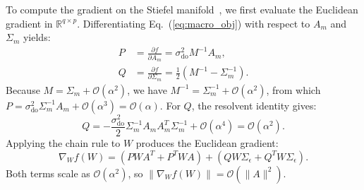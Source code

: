 \documentclass[preprint,12pt]{elsarticle}
\begin{document}
To compute the gradient on the Stiefel manifold~\cite{Edelman1998,Absil2008}, we first evaluate the Euclidean gradient in $\mathbb{R}^{q \times p}$. Differentiating Eq.~(\ref{eq:macro_obj}) with respect to $A_m$ and $\Sigma_m$ yields:
\begin{align}
P &= \frac{\partial f}{\partial A_m} = \sigma_{\mathrm{do}}^2 M^{-1} A_m, \label{eq:P_deriv} \\
Q &= \frac{\partial f}{\partial \Sigma_m} = \frac{1}{2} \left( M^{-1} - \Sigma_m^{-1} \right). \label{eq:Q_deriv}
\end{align}
Because $M = \Sigma_m + \mathcal{O}(\alpha^2)$, we have $M^{-1} = \Sigma_m^{-1} + \mathcal{O}(\alpha^2)$, from which $P = \sigma_{\mathrm{do}}^2 \Sigma_m^{-1} A_m + \mathcal{O}(\alpha^3) = \mathcal{O}(\alpha)$. For $Q$, the resolvent identity gives:
\begin{equation}
Q = -\frac{\sigma_{\mathrm{do}}^2}{2} \Sigma_m^{-1} A_m A_m^T \Sigma_m^{-1} + \mathcal{O}(\alpha^4) = \mathcal{O}(\alpha^2).
\end{equation}
Applying the chain rule to $W$ produces the Euclidean gradient:
\begin{equation}
\nabla_W f(W) = \left( P W A^T + P^T W A \right) + \left( Q W \Sigma_\epsilon + Q^T W \Sigma_\epsilon \right).
\label{eq:euclidean_grad}
\end{equation}
Both terms scale as $\mathcal{O}(\alpha^2)$, so $\| \nabla_W f(W) \| = \mathcal{O}(\|A\|^2)$.
\end{document}
